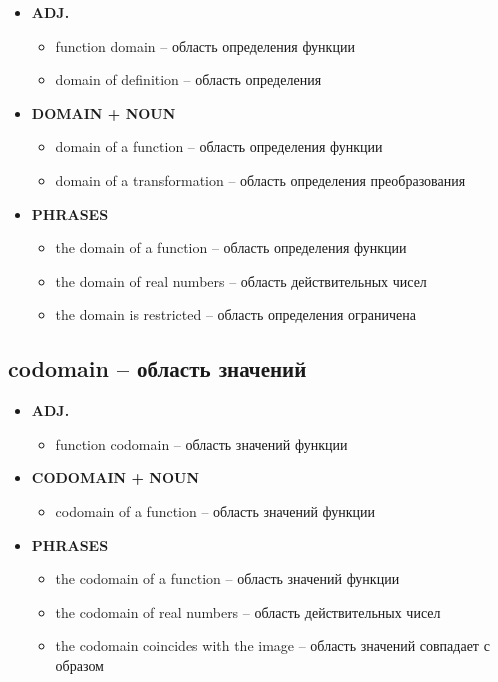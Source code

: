 \documentclass[a4paper, 10pt]{article}
\theoremstyle{definition}
\theoremstyle{plain}
\theoremstyle{remark}
\begin{document}
\begin{itemize}
    \item \textbf{ADJ.}
    \begin{itemize}
        \item function domain – область определения функции
        \item domain of definition – область определения
    \end{itemize}
    
    \item \textbf{DOMAIN + NOUN}
    \begin{itemize}
        \item domain of a function – область определения функции
        \item domain of a transformation – область определения преобразования
    \end{itemize}
    
    \item \textbf{PHRASES}
    \begin{itemize}
        \item the domain of a function – область определения функции
        \item the domain of real numbers – область действительных чисел
        \item the domain is restricted – область определения ограничена
    \end{itemize}
\end{itemize}

\subsection{codomain – область значений}

\begin{itemize}
    \item \textbf{ADJ.}
    \begin{itemize}
        \item function codomain – область значений функции
    \end{itemize}
    
    \item \textbf{CODOMAIN + NOUN}
    \begin{itemize}
        \item codomain of a function – область значений функции
    \end{itemize}
    
    \item \textbf{PHRASES}
    \begin{itemize}
        \item the codomain of a function – область значений функции
        \item the codomain of real numbers – область действительных чисел
        \item the codomain coincides with the image – область значений совпадает с образом
    \end{itemize}
\end{itemize}
\end{document}
